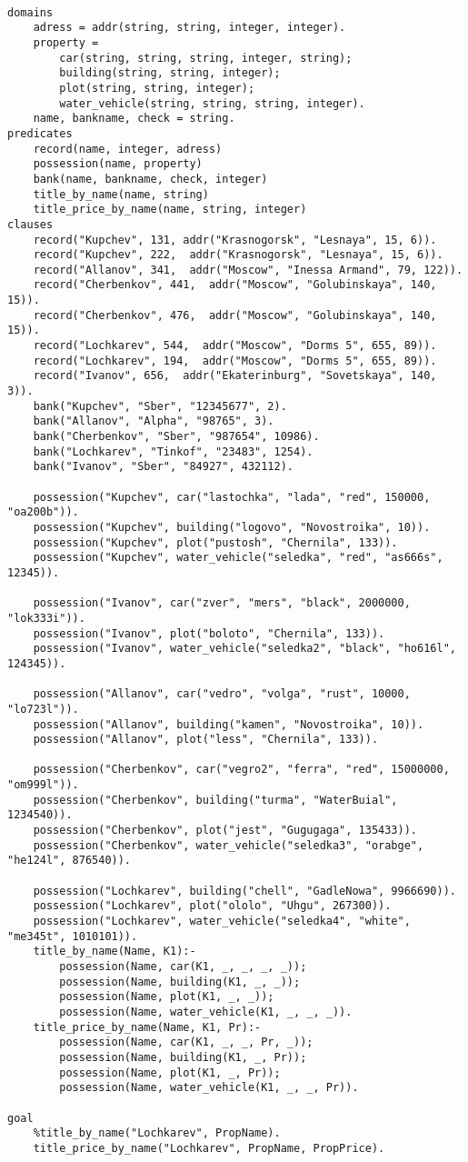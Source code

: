 \documentclass[a4paper,14pt, unknownkeysallowed]{extreport}
\begin{document}



\begin{lstlisting}
	
domains
	adress = addr(string, string, integer, integer).
	property = 
		car(string, string, string, integer, string); 
		building(string, string, integer); 
		plot(string, string, integer); 
		water_vehicle(string, string, string, integer).
	name, bankname, check = string.
predicates
	record(name, integer, adress)
	possession(name, property)
	bank(name, bankname, check, integer)
	title_by_name(name, string)
	title_price_by_name(name, string, integer)
clauses
	record("Kupchev", 131, addr("Krasnogorsk", "Lesnaya", 15, 6)).
	record("Kupchev", 222,  addr("Krasnogorsk", "Lesnaya", 15, 6)).
	record("Allanov", 341,  addr("Moscow", "Inessa Armand", 79, 122)).
	record("Cherbenkov", 441,  addr("Moscow", "Golubinskaya", 140, 15)).
	record("Cherbenkov", 476,  addr("Moscow", "Golubinskaya", 140, 15)).
	record("Lochkarev", 544,  addr("Moscow", "Dorms 5", 655, 89)).
	record("Lochkarev", 194,  addr("Moscow", "Dorms 5", 655, 89)).
	record("Ivanov", 656,  addr("Ekaterinburg", "Sovetskaya", 140, 3)).
	bank("Kupchev", "Sber", "12345677", 2).
	bank("Allanov", "Alpha", "98765", 3).
	bank("Cherbenkov", "Sber", "987654", 10986).
	bank("Lochkarev", "Tinkof", "23483", 1254).
	bank("Ivanov", "Sber", "84927", 432112).
	
	possession("Kupchev", car("lastochka", "lada", "red", 150000, "oa200b")).
	possession("Kupchev", building("logovo", "Novostroika", 10)).
	possession("Kupchev", plot("pustosh", "Chernila", 133)).
	possession("Kupchev", water_vehicle("seledka", "red", "as666s", 12345)).
	
	possession("Ivanov", car("zver", "mers", "black", 2000000, "lok333i")).
	possession("Ivanov", plot("boloto", "Chernila", 133)).
	possession("Ivanov", water_vehicle("seledka2", "black", "ho616l", 124345)).
	
	possession("Allanov", car("vedro", "volga", "rust", 10000, "lo723l")).
	possession("Allanov", building("kamen", "Novostroika", 10)).
	possession("Allanov", plot("less", "Chernila", 133)).
	
	possession("Cherbenkov", car("vegro2", "ferra", "red", 15000000, "om999l")).
	possession("Cherbenkov", building("turma", "WaterBuial", 1234540)).
	possession("Cherbenkov", plot("jest", "Gugugaga", 135433)).
	possession("Cherbenkov", water_vehicle("seledka3", "orabge", "he124l", 876540)).
	
	possession("Lochkarev", building("chell", "GadleNowa", 9966690)).
	possession("Lochkarev", plot("ololo", "Uhgu", 267300)).
	possession("Lochkarev", water_vehicle("seledka4", "white", "me345t", 1010101)).
	title_by_name(Name, K1):-
		possession(Name, car(K1, _, _, _, _));
		possession(Name, building(K1, _, _));
		possession(Name, plot(K1, _, _));
		possession(Name, water_vehicle(K1, _, _, _)).
	title_price_by_name(Name, K1, Pr):-
		possession(Name, car(K1, _, _, Pr, _));
		possession(Name, building(K1, _, Pr));
		possession(Name, plot(K1, _, Pr));
		possession(Name, water_vehicle(K1, _, _, Pr)).
	
goal
	%title_by_name("Lochkarev", PropName).
	title_price_by_name("Lochkarev", PropName, PropPrice).
\end{lstlisting}
\end{document}
